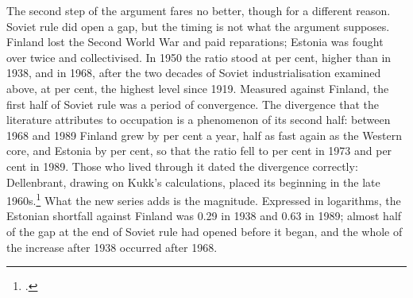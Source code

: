 The second step of the argument fares no better, though for a different reason. Soviet rule did open a gap, but the timing is not what the argument supposes. Finland lost the Second World War and paid reparations; Estonia was fought over twice and collectivised. In 1950 the ratio stood at  per cent, higher than in 1938, and in 1968, after the two decades of Soviet industrialisation examined above, at  per cent, the highest level since 1919. Measured against Finland, the first half of Soviet rule was a period of convergence. The divergence that the literature attributes to occupation is a phenomenon of its second half: between 1968 and 1989 Finland grew by  per cent a year, half as fast again as the Western core, and Estonia by  per cent, so that the ratio fell to  per cent in 1973 and  per cent in 1989. Those who lived through it dated the divergence correctly: Dellenbrant, drawing on Kukk's calculations, placed its beginning in the late 1960s.\footnote{\autocite[205]{dellenbrant1992}.} What the new series adds is the magnitude. Expressed in logarithms, the Estonian shortfall against Finland was 0.29 in 1938 and 0.63 in 1989; almost half of the gap at the end of Soviet rule had opened before it began, and the whole of the increase after 1938 occurred after 1968.

